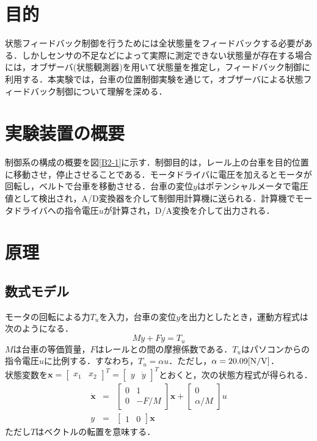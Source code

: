 \documentclass[12pt]{jsarticle}
\begin{document}
\section{目的}
状態フィードバック制御を行うためには全状態量をフィードバックする必要がある．しかしセンサの不足などによって実際に測定できない状態量が存在する場合には，オブザーバ(状態観測器)を用いて状態量を推定し，フィードバック制御に利用する．本実験では，台車の位置制御実験を通じて，オブザーバによる状態フィードバック制御について理解を深める．
\section{実験装置の概要}
制御系の構成の概要を図\ref{B2-1}に示す．制御目的は，レール上の台車を目的位置に移動させ，停止させることである．モータドライバに電圧を加えるとモータが回転し，ベルトで台車を移動させる．台車の変位$y$はポテンシャルメータで電圧値として検出され，A/D変換器を介して制御用計算機に送られる．計算機でモータドライバへの指令電圧$u$が計算され，D/A変換を介して出力される．
\section{原理}
\subsection{数式モデル}
モータの回転による力$T_u$を入力，台車の変位$y$を出力としたとき，運動方程式は次のようになる．
\begin{equation}
  \label{Equation-B2-1}
  M\ddot{y} + F\dot{y} = T_u
\end{equation}
$M$は台車の等価質量，$F$はレールとの間の摩擦係数である．$T_u$はパソコンからの指令電圧$u$に比例する．すなわち，$T_u=\alpha u$．ただし，$\alpha = 20.09{\rm [N/V]}$．\\
状態変数を${\bm x}=\left[\begin{array}{cc}x_1 & x_2\end{array}\right]^T = \left[\begin{array}{cc}y & \dot{y}\end{array}\right]^T$とおくと，次の状態方程式が得られる．
\begin{eqnarray}
  \label{Equation-B2-2}
  \dot{\bm x} &=& \left[\begin{array}{cc}0& 1\\0& -F/M\end{array}\right] {\bm x} + \left[\begin{array}{c}0\\\alpha/M\end{array}\right] u \\ \nonumber
  y &=& \left[\begin{array}{cc}1 &0\end{array}\right] {\bm x}
\end{eqnarray}
ただし$T$はベクトルの転置を意味する．
\end{document}
